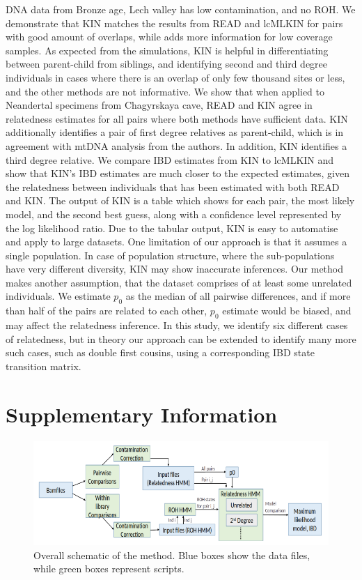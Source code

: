 \documentclass[12pt, letterpaper]{article}
\begin{document}
DNA data from Bronze age, Lech valley has low contamination, and no ROH. We demonstrate that KIN matches the results from READ and lcMLKIN for pairs with good amount of overlaps, while adds more information for low coverage samples. As expected from the simulations, KIN is helpful in differentiating between parent-child from siblings, and identifying second and third degree individuals in cases where there is an overlap of only few thousand sites or less, and the other methods are not informative. We show that when applied to Neandertal specimens from Chagyrskaya cave, READ and KIN agree in relatedness estimates for all pairs where both methods have sufficient data. KIN additionally identifies a pair of first degree relatives as parent-child, which is in agreement with mtDNA analysis from the authors. In addition, KIN identifies a third degree relative. We compare IBD estimates from KIN to lcMLKIN and show that KIN's IBD estimates are much closer to the expected estimates, given the relatedness between individuals that has been estimated with both READ and KIN. 
The output of KIN is a table which shows for each pair, the most likely model, and the second best guess, along with a confidence level represented by the log likelihood ratio. Due to the tabular output, KIN is easy to automatise and apply to large datasets. 
One limitation of our approach is that it assumes a single population. In case of population structure, where the sub-populations have very different diversity, KIN may show inaccurate inferences. Our method makes another assumption, that the dataset comprises of at least some unrelated individuals. We estimate $p_0$ as the median of all pairwise differences, and if more than half of the pairs are related to each other, $p_0$ estimate would be biased, and may affect the relatedness inference. In this study, we identify six different cases of relatedness, but in theory our approach can be extended to identify many more such cases, such as double first cousins, using a corresponding IBD state transition matrix.


\section{Supplementary Information}



\renewcommand{\figurename}{Fig. S}
\begin{figure}[h!]
    \includegraphics[width=18cm]{plots/inkscape_finalImg/schematic_sup.png}
    \centering
    \caption{Overall schematic of the method. Blue boxes show the data files, while green boxes represent scripts.}
    \label{figS0:schematic}
\end{figure}
\end{document}

